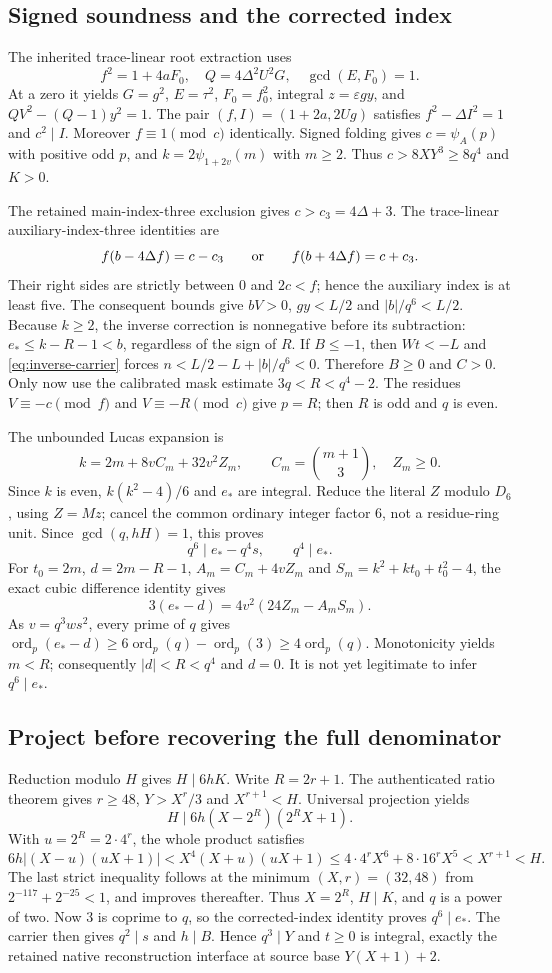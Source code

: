 \subsection{Signed soundness and the corrected index}
The inherited trace-linear root extraction uses
\[
f^2=1+4aF_0,\quad Q=4\Delta^2U^2G,\quad \gcd(E,F_0)=1.
\]
At a zero it yields $G=g^2$, $E=\tau^2$, $F_0=f_0^2$, integral
$z=\varepsilon gy$, and $QV^2-(Q-1)y^2=1$.  The pair
$(f,I)=(1+2a,2Ug)$ satisfies $f^2-\Delta I^2=1$ and $c^2\mid I$.
Moreover $f\equiv1\pmod c$ identically.  Signed folding gives
$c=\psi_A(p)$ with positive odd $p$, and
$k=2\psi_{1+2v}(m)$ with $m\ge2$.  Thus
$c>8XY^3\ge8q^4$ and $K>0$.

The retained main-index-three exclusion gives $c>c_3=4\Delta+3$.
The trace-linear auxiliary-index-three identities are
\[
f(b-4\Delta f)=c-c_3\qquad\hbox{or}\qquad
f(b+4\Delta f)=c+c_3.
\]
Their right sides are strictly between $0$ and $2c<f$; hence the
auxiliary index is at least five.  The consequent bounds give
$bV>0$, $gy<L/2$ and $|b|/q^6<L/2$.
Because $k\ge2$, the inverse correction is nonnegative before its
subtraction: $e_*\le k-R-1<b$, regardless of the sign of $R$.
If $B\le-1$, then $Wt<-L$ and \eqref{eq:inverse-carrier} forces
$n<L/2-L+|b|/q^6<0$.  Therefore $B\ge0$ and $C>0$.
Only now use the calibrated mask estimate $3q<R<q^4-2$.
The residues $V\equiv-c\pmod f$ and $V\equiv-R\pmod c$ give $p=R$;
then $R$ is odd and $q$ is even.

The unbounded Lucas expansion is
\[
k=2m+8vC_m+32v^2Z_m,\qquad C_m=\binom{m+1}{3},\quad Z_m\ge0.
\]
Since $k$ is even, $k(k^2-4)/6$ and $e_*$ are integral.
Reduce the literal $Z$ modulo $D_6$, using $Z=Mz$; cancel the common
ordinary integer factor $6$, not a residue-ring unit.  Since
$\gcd(q,hH)=1$, this proves
\[
q^6\mid e_*-q^4s,\qquad q^4\mid e_*.
\]
For $t_0=2m$, $d=2m-R-1$, $A_m=C_m+4vZ_m$ and
$S_m=k^2+kt_0+t_0^2-4$, the exact cubic difference identity gives
\[
3(e_*-d)=4v^2(24Z_m-A_mS_m).
\]
As $v=q^3ws^2$, every prime of $q$ gives
$\operatorname{ord}_p(e_*-d)\ge6\operatorname{ord}_p(q)
-\operatorname{ord}_p(3)\ge4\operatorname{ord}_p(q)$.
Monotonicity yields $m<R$; consequently $|d|<R<q^4$ and $d=0$.
It is not yet legitimate to infer $q^6\mid e_*$.

\subsection{Project before recovering the full denominator}
Reduction modulo $H$ gives $H\mid6hK$.  Write $R=2r+1$.
The authenticated ratio theorem gives $r\ge48$, $Y>X^r/3$ and
$X^{r+1}<H$.  Universal projection yields
\[
H\mid6h(X-2^R)(2^RX+1).
\]
With $u=2^R=2\cdot4^r$, the whole product satisfies
\[
6h|(X-u)(uX+1)|
 <X^4(X+u)(uX+1)
 \le4\cdot4^rX^6+8\cdot16^rX^5<X^{r+1}<H.
\]
The last strict inequality follows at the minimum $(X,r)=(32,48)$
from $2^{-117}+2^{-25}<1$, and improves thereafter.
Thus $X=2^R$, $H\mid K$, and $q$ is a power of two.
Now $3$ is coprime to $q$, so the corrected-index identity proves
$q^6\mid e_*$.  The carrier then gives $q^2\mid s$ and $h\mid B$.
Hence $q^3\mid Y$ and $t\ge0$ is integral, exactly the retained
native reconstruction interface at source base $Y(X+1)+2$.

